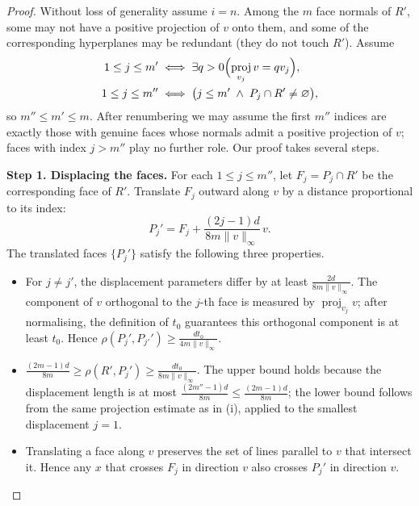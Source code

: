 \documentclass[10pt,a4paper]{amsart}
\DeclareMathOperator{\proj}{proj}
\begin{document}
\begin{proof}
Without loss of generality assume $i=n$.  Among the $m$ face normals of $R'$,
some may not have a positive projection of $v$ onto them, and some of the
corresponding hyperplanes may be redundant (they do not touch $R'$).  Assume 
\begin{align*}
1\leq j\leq m' &\iff \exists q>0\Bigl(\proj_{v_j} v=q v_j\Bigr),\\
1\leq j\leq m'' &\iff \bigl(j\leq m'\;\wedge\; P_j\cap R'\neq\varnothing\bigr),
\end{align*}
so $m''\leq m'\leq m$.  After renumbering we may assume the first $m''$
indices are exactly those with genuine faces whose normals admit a positive
projection of $v$; faces with index $j>m''$ play no further role. Our proof takes several steps.

\medskip\noindent
\textbf{Step 1.  Displacing the faces.}
For each $1\leq j\leq m''$, let $F_j=P_j\cap R'$ be the corresponding face
of $R'$.  Translate $F_j$ outward along $v$ by a distance proportional to
its index:
\[
P_j' = F_j+\frac{(2j-1)d}{8m\|v\|_\infty}\,v .
\]
The translated faces $\{P_j'\}$ satisfy the following three properties.
\begin{itemize}
\item[(i)] For $j\neq j'$, the displacement parameters differ by at least
$\frac{2d}{8m\|v\|_\infty}$.  The component of $v$ orthogonal to the $j$-th
face is measured by $\proj_{v_j}v$; after normalising, the definition of
$t_0$ guarantees this orthogonal component is at least $t_0$.  Hence
$\rho(P_j',P_{j'}') \geq \frac{d t_0}{4m\|v\|_\infty}$.
\item[(ii)] $\frac{(2m-1)d}{8m}\geq\rho(R', P_j') \geq \frac{d t_0}{8m\|v\|_\infty}$.
The upper bound holds because the displacement length is at most
$\frac{(2m''-1)d}{8m}\leq\frac{(2m-1)d}{8m}$; the lower bound follows from
the same projection estimate as in (i), applied to the smallest displacement
$j=1$.
\item[(iii)] Translating a face along $v$ preserves the set of lines parallel
to $v$ that intersect it.  Hence any $x$ that crosses $F_j$ in direction $v$
also crosses $P_j'$ in direction $v$.
\end{itemize}


\end{proof}
\end{document}
